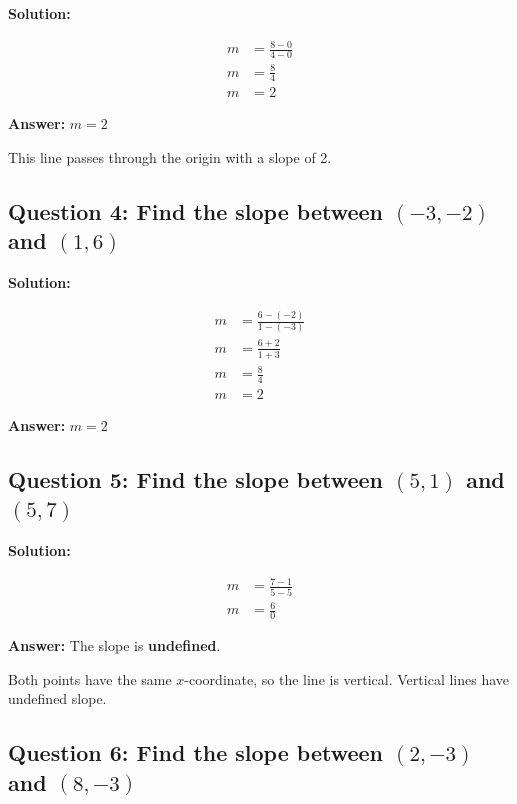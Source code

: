 \documentclass[12pt]{article}
\begin{document}
\noindent\textbf{Solution:}

\begin{align*}
m &= \frac{8 - 0}{4 - 0} \\
m &= \frac{8}{4} \\
m &= 2
\end{align*}

\textbf{Answer: } $m = 2$

This line passes through the origin with a slope of 2.

\vspace{0.3cm}

\subsection*{Question 4: Find the slope between $(-3, -2)$ and $(1, 6)$}

\noindent\textbf{Solution:}

\begin{align*}
m &= \frac{6 - (-2)}{1 - (-3)} \\
m &= \frac{6 + 2}{1 + 3} \\
m &= \frac{8}{4} \\
m &= 2
\end{align*}

\textbf{Answer: } $m = 2$

\vspace{0.3cm}

\subsection*{Question 5: Find the slope between $(5, 1)$ and $(5, 7)$}

\noindent\textbf{Solution:}

\begin{align*}
m &= \frac{7 - 1}{5 - 5} \\
m &= \frac{6}{0}
\end{align*}

\textbf{Answer: } The slope is \textbf{undefined}.

Both points have the same $x$-coordinate, so the line is vertical. Vertical lines have undefined slope.

\vspace{0.3cm}

\subsection*{Question 6: Find the slope between $(2, -3)$ and $(8, -3)$}
\end{document}
